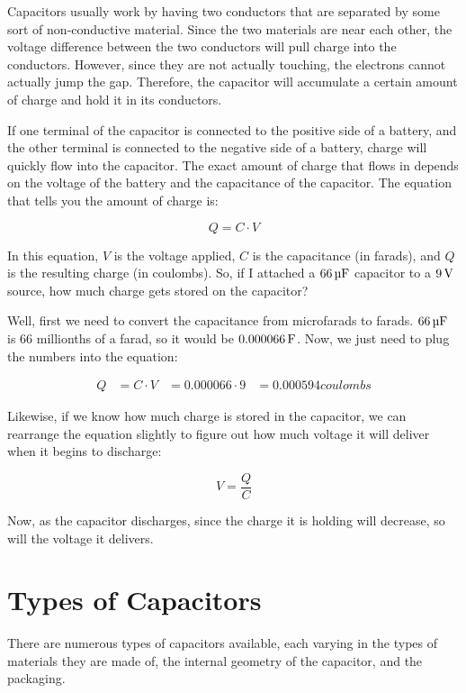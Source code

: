 Capacitors usually work by having two conductors that are separated by some sort of non-conductive material.
Since the two materials are near each other, the voltage difference between the two conductors will pull charge into the conductors.  
However, since they are not actually touching, the electrons cannot actually jump the gap.
Therefore, the capacitor will accumulate a certain amount of charge and hold it in its conductors.

If one terminal of the capacitor is connected to the positive side of a battery, and the other terminal is connected to the negative side of a battery, charge will quickly flow into the capacitor.
The exact amount of charge that flows in depends on the voltage of the battery and the capacitance of the capacitor.
The equation that tells you the amount of charge is:

\begin{equation}
Q = C\cdot V
\end{equation}

In this equation, $V$ is the voltage applied, $C$ is the capacitance (in farads), and $Q$ is the resulting charge (in coulombs).
So, if I attached a $66\,\si{\micro\farad}$ capacitor to a $9\,\si{\volt}$ source, how much charge gets stored on the capacitor?

Well, first we need to convert the capacitance from microfarads to farads.  
$66\,\si{\micro\farad}$ is 66 millionths of a farad, so it would be $0.000066\,\si{\farad}$.
Now, we just need to plug the numbers into the equation:

\begin{align*}
Q &= C\cdot V
  &= 0.000066\cdot 9
  &= 0.000594 coulombs
\end{align*}

Likewise, if we know how much charge is stored in the capacitor, we can rearrange the equation slightly to figure out how much voltage it will deliver when it begins to discharge:

\begin{equation}
V = \frac{Q}{C}
\end{equation}

Now, as the capacitor discharges, since the charge it is holding will decrease, so will the voltage it delivers.

\section{Types of Capacitors}

There are numerous types of capacitors available, each varying in the types of materials they are made of, the internal geometry of the capacitor, and the packaging.

